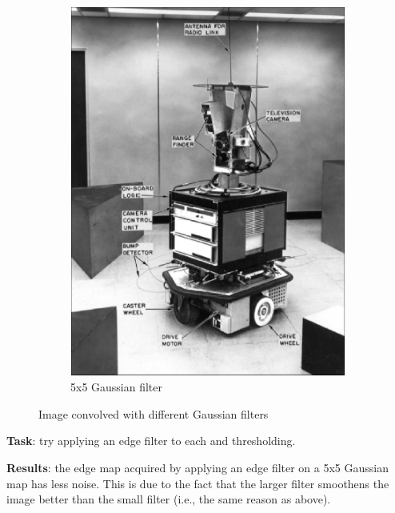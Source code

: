 \documentclass[lettersize,journal]{IEEEtran}
\begin{document}
\begin{figure}[h]
\begin{subfigure}[h]{0.23\textwidth}
        \includegraphics[width=\linewidth]{gaussian_5x5_map}
        \caption{5x5 Gaussian filter}  
    \end{subfigure}
    \caption{Image convolved with different Gaussian filters}
    \label{fig:1}
\end{figure}

\newpage

\noindent\textbf{Task}: try applying an edge filter to each and thresholding.

\hbox{}

\noindent\textbf{Results}: the edge map acquired by applying an edge filter on a 5x5 Gaussian map has less noise. This is due to the fact that the larger filter smoothens the image better than the small filter (i.e., the same reason as above).
\end{document}
